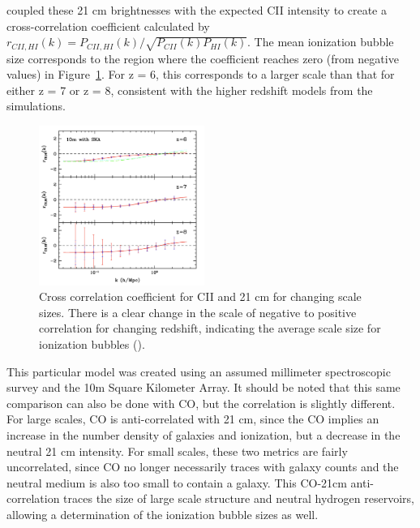 \documentclass[manuscript]{aastex}
\begin{document}
\cite{Gong2012} coupled these 21 cm brightnesses with the expected CII intensity to create a cross-correlation coefficient calculated by \(r_{CII,HI}(k) = P_{CII,HI}(k)/\sqrt{P_{CII}(k)P_{HI}(k)}\). The mean ionization bubble size corresponds to the region where the coefficient reaches zero (from negative values) in Figure~\ref{fig:gong2}. For z = 6, this corresponds to a larger scale than that for either z = 7 or z = 8, consistent with the higher redshift models from the \cite{Santos2010} simulations. 
\begin{figure}
\vspace{-0.8cm}
  \begin{center}
    \includegraphics[width=0.48\textwidth]{gong4.png}
  \end{center}
  \caption[Cross correlation coefficient for CII and 21 cm showing ionization bubble size with redshift. -(\cite{Gong2012})]{Cross correlation coefficient for CII and 21 cm for changing scale sizes. There is a clear change in the scale of negative to positive correlation for changing redshift, indicating the average scale size for ionization bubbles (\cite{Gong2012}).}
  \label{fig:gong2}
  \vspace{-0.8cm}
\end{figure}
This particular model was created using an assumed millimeter spectroscopic survey and the 10m Square Kilometer Array. It should be noted that this same comparison can also be done with CO, but the correlation is slightly different. For large scales, CO is anti-correlated with 21 cm, since the CO implies an increase in the number density of galaxies and ionization, but a decrease in the neutral 21 cm intensity. For small scales, these two metrics are fairly uncorrelated, since CO no longer necessarily traces with galaxy counts and the neutral medium is also too small to contain a galaxy. This CO-21cm anti-correlation traces the size of large scale structure and neutral hydrogen reservoirs, allowing a determination of the ionization bubble sizes as well. 
\end{document}
